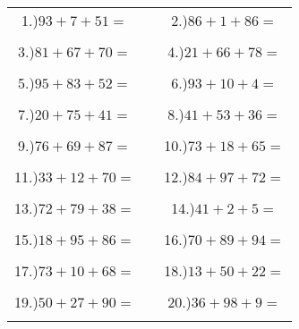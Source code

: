 \documentclass{article}
\begin{document}
\begin{tabular}{ccc}
1.)$93+7+51=$& \hspace{5cm} &2.)$86+1+86=$\\\\
3.)$81+67+70=$& \hspace{5cm} &4.)$21+66+78=$\\\\
5.)$95+83+52=$& \hspace{5cm} &6.)$93+10+4=$\\\\
7.)$20+75+41=$& \hspace{5cm} &8.)$41+53+36=$\\\\
9.)$76+69+87=$& \hspace{5cm} &10.)$73+18+65=$\\\\
11.)$33+12+70=$& \hspace{5cm} &12.)$84+97+72=$\\\\
13.)$72+79+38=$& \hspace{5cm} &14.)$41+2+5=$\\\\
15.)$18+95+86=$& \hspace{5cm} &16.)$70+89+94=$\\\\
17.)$73+10+68=$& \hspace{5cm} &18.)$13+50+22=$\\\\
19.)$50+27+90=$& \hspace{5cm} &20.)$36+98+9=$\\\\
\end{tabular}
\newpage
\end{document}
